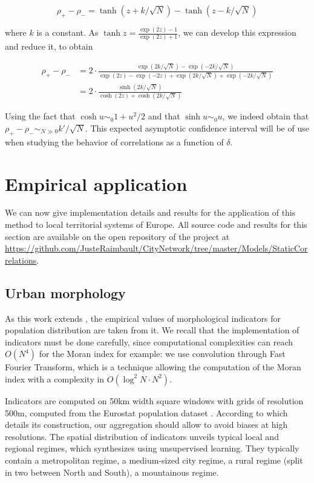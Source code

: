 \documentclass[11pt]{article}
\begin{document}
\[
\rho_{+} - \rho_{-} = \tanh (z + k / \sqrt{N}) - \tanh (z - k / \sqrt{N})
\]

where $k$ is a constant. As $\tanh{z} = \frac{\exp (2z) - 1}{\exp (2z) + 1}$, we can develop this expression and reduce it, to obtain

\[
\begin{split}
	\rho_{+} - \rho_{-} & = 2\cdot \frac{\exp (2k/\sqrt{N})-\exp (-2k/\sqrt{N})}{\exp (2z)-\exp (-2z) + \exp (2k/\sqrt{N}) + \exp (-2k/\sqrt{N})}\\
	& = 2\cdot \frac{\sinh{(2k/\sqrt{N})}}{\cosh{(2z)} + \cosh{(2k/\sqrt{N})}}
\end{split}
\]

Using the fact that $\cosh u \sim_0 1 + u^2/2$ and that $\sinh u \sim_0 u$, we indeed obtain that $\rho_{+} - \rho_{-} \sim_{N\gg 0} k' / \sqrt{N}$. This expected asymptotic confidence interval will be of use when studying the behavior of correlations as a function of $\delta$.




\section{Empirical application}

We can now give implementation details and results for the application of this method to local territorial systems of Europe. All source code and results for this section are available on the open repository of the project at \url{https://github.com/JusteRaimbault/CityNetwork/tree/master/Models/StaticCorrelations}.

\subsection{Urban morphology}

As this work extends \cite{2017arXiv170806743R}, the empirical values of morphological indicators for population distribution are taken from it. We recall that the implementation of indicators must be done carefully, since computational complexities can reach $O(N^4)$ for the Moran index for example: we use convolution through Fast Fourier Transform, which is a technique allowing the computation of the Moran index with a complexity in $O(\log^2 N \cdot N^2)$.

Indicators are computed on 50km width square windows with grids of resolution 500m, computed from the Eurostat population dataset \citep{eurostat}. According to \cite{batista2013high} which details its construction, our aggregation should allow to avoid biases at high resolutions. The spatial distribution of indicators unveils typical local and regional regimes, which \cite{2017arXiv170806743R} synthesizes using unsupervised learning. They typically contain a metropolitan regime, a medium-sized city regime, a rural regime (split in two between North and South), a mountainous regime.
\end{document}
